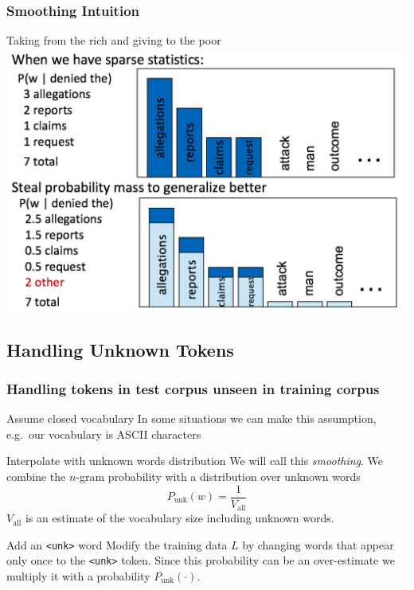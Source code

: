 \begin{frame}
\frametitle{Smoothing Intuition}
\begin{block}{Taking from the rich and giving to the poor}
\includegraphics[scale=0.3]{figures/lm/smoothing.png}
\end{block}
\end{frame}

\subsection{Handling Unknown Tokens}

\begin{frame}
\frametitle{Handling tokens in test corpus unseen in training corpus}
\begin{block}{Assume closed vocabulary}
In some situations we can make this assumption, e.g.\ our vocabulary is ASCII characters
\end{block}
\pause
\begin{block}{Interpolate with unknown words distribution}
We will call this {\em smoothing}. We combine the $n$-gram probability with a distribution over unknown words 
\smallskip
\[ P_{\textrm{unk}}(w) = \frac{1}{V_{\textrm{all}}} \] 
$V_{\textrm{all}}$ is an estimate of the vocabulary size including unknown words.
\end{block}
\pause
\begin{block}{Add an \texttt{<unk>} word}
Modify the training data $L$ by changing words that appear only once to the \texttt{<unk>} token. Since this probability can be an over-estimate we multiply it with a probability $P_{\textrm{unk}}(\cdot)$.
\end{block}
\end{frame}

